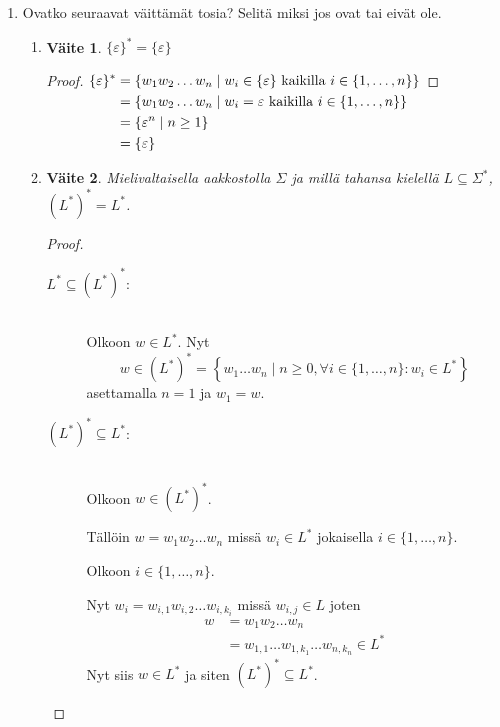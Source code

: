 \documentclass[a4paper,11pt,draft]{article}
\newtheorem*{claim}{Väite}
\newenvironment{lalign}%
{\begin{math}\begin{aligned}[t]}%
{\end{aligned}\end{math}}
\begin{document}
\begin{enumerate}
\item Ovatko seuraavat väittämät tosia? Selitä miksi jos ovat tai
  eivät ole.
  \begin{enumerate}
  \item
    \begin{claim}
      $\{\varepsilon\}^{*} = \{\varepsilon\}$
    \end{claim}
    \begin{proof}
      \begin{lalign}
        \{\varepsilon\}^*
        &= \{w_1w_2 \ldots w_n \mid w_i \in \{\varepsilon\}
           \text{ kaikilla } i \in \{1, \ldots, n\}\}\\
        &= \{w_1w_2 \ldots w_n \mid w_i = \varepsilon
           \text{ kaikilla } i \in \{1, \ldots, n\}\}\\
        &= \{\varepsilon^n \mid n \ge 1\}\\
        &= \{\varepsilon\} \qedhere
      \end{lalign}
    \end{proof}

\newpage
  \item
    \begin{claim}
      Mielivaltaisella aakkostolla $\Sigma$ ja millä tahansa kielellä
      $L \subseteq \Sigma^*$, $(L^*)^* = L^*$.
    \end{claim}
    \begin{proof}
      \hfill
      \begin{description}
      \item[$L^* \subseteq (L^*)^*$:] \hfill \\
        Olkoon $w \in L^*$. Nyt
        \begin{equation*}
        w \in (L^*)^* = \left\{w_1 \ldots w_n \mid n \ge 0,\forall i
        \in \{1, \ldots, n\}: w_i \in L^* \right\}
        \end{equation*}
        asettamalla $n = 1$ ja $w_1 = w$.
      \item[$(L^*)^* \subseteq L^*$:] \hfill \\
        Olkoon $w \in (L^*)^*$.

        Tällöin $w = w_1w_2 \ldots w_n$ missä $w_i \in L^*$ jokaisella
        $i \in \{1, \ldots, n\}$.

        Olkoon $i \in \{1, \ldots, n\}$.

        Nyt $w_i = w_{i,1}w_{i,2} \ldots w_{i,k_i}$ missä $w_{i,j} \in
        L$ joten
        \begin{align*}
          w &= w_1w_2 \ldots w_n \\
          &= w_{1,1} \ldots w_{1,k_1} \ldots w_{n,k_n} \in L^*
        \end{align*}
        Nyt siis $w \in L^*$ ja siten $(L^*)^* \subseteq L^*$.
      \end{description}


\end{proof}
\end{enumerate}
\end{enumerate}
\end{document}

